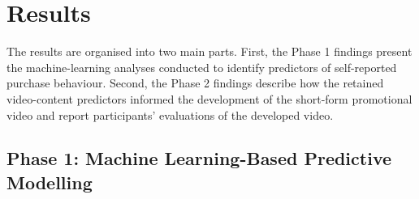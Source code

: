 \documentclass[jtaer,article,submit,moreauthors]{Definitions/mdpi}
\begin{document}
\section{Results}

The results are organised into two main parts. First, the Phase 1
findings present the machine-learning analyses conducted to identify
predictors of self-reported purchase behaviour. Second, the Phase 2
findings describe how the retained video-content predictors informed
the development of the short-form promotional video and report
participants' evaluations of the developed video.

\subsection{Phase 1: Machine Learning-Based Predictive Modelling}
\end{document}
